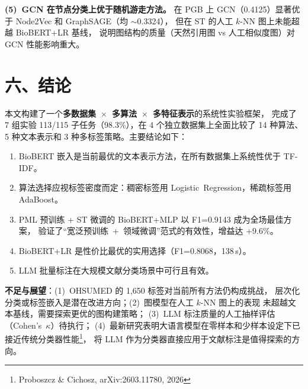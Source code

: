 \documentclass[12pt,a4paper]{ctexart}
\begin{document}
\textbf{(5)~GCN 在节点分类上优于随机游走方法。}
在 PGB 上 GCN（0.4125）显著优于 Node2Vec 和 GraphSAGE（均 $\sim$0.3324），
但在 ST 的人工 $k$-NN 图上未能超越 BioBERT+LR 基线，
说明图结构的质量（天然引用图 vs 人工相似度图）对 GCN 性能影响重大。

\section{六、结论}

本文构建了一个\textbf{多数据集~$\times$~多算法~$\times$~多特征表示}的系统性实验框架，
完成了 7 组实验 113/115 子任务（98.3\%），在 4 个独立数据集上全面比较了 14 种算法、
5 种文本表示和 3 种多标签策略。主要结论如下：

\begin{enumerate}
  \setlength{\itemsep}{-1pt}\setlength{\parsep}{0pt}
  \item BioBERT 嵌入是当前最优的文本表示方法，在所有数据集上系统性优于 TF-IDF。
  \item 算法选择应视标签密度而定：稠密标签用 Logistic~Regression，稀疏标签用 AdaBoost。
  \item PML 预训练 + ST 微调的 BioBERT+MLP 以 F1=0.9143 成为全场最佳方案，
  验证了“宽泛预训练~+~领域微调”范式的有效性，增益达 +9.6\%。
  \item BioBERT+LR 是性价比最优的实用选择（F1=0.8068，138\,s）。
  \item LLM 批量标注在大规模文献分类场景中可行且有效。
\end{enumerate}

\textbf{不足与展望}：(1)~OHSUMED 的 1,650 标签对当前所有方法仍构成挑战，
层次化分类或标签嵌入是潜在改进方向；(2)~图模型在人工 $k$-NN 图上的表现
未超越文本基线，需要探索更优的图构建策略；
(3)~LLM 标注质量的人工抽样评估（Cohen's~$\kappa$）待执行；
(4)~最新研究表明大语言模型在零样本和少样本设定下已接近传统分类器性能\footnote{Proboszcz \& Cichosz, arXiv:2603.11780, 2026}，
将 LLM 作为分类器直接应用于文献标注是值得探索的方向。
\end{document}

